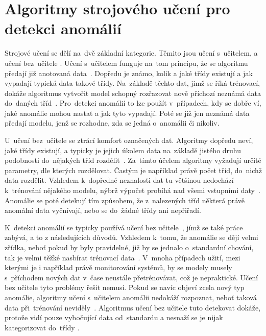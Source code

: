 \chapter{Algoritmy strojového učení pro detekci anomálií}
\label{ml-algoritmy}

Strojové učení se dělí na~dvě základní kategorie. Těmito jsou učení s~učitelem, a učení bez~učitele \cite{data-science-concepts-and-practice}. Učení s~učitelem funguje na~tom principu, že se algoritmu předají již anotovaná data~\cite{data-science-concepts-and-practice}. Dopředu je známo, kolik a jaké třídy existují a jak vypadají typická data takové třídy. Na~základě těchto dat, jimž se říká trénovací, dokáže algoritmus vytvořit model schopný rozřazovat nově příchozí neznámá data do~daných tříd~\cite{data-science-concepts-and-practice}. Pro~detekci anomálií to lze použít v~případech, kdy se dobře ví, jaké anomálie mohou nastat a jak tyto vypadají. Poté se již jen neznámá data předají modelu, jenž se rozhodne, zda se jedná o~anomálii či nikoliv.

U~učení bez~učitele se ztrácí komfort označených dat. Algoritmy dopředu neví, jaké třídy existují, a typicky je jejich úkolem data na~základě jistého druhu podobnosti do~nějakých tříd rozdělit~\cite{data-science-concepts-and-practice}. Za~tímto účelem algoritmy vyžadují určité parametry, dle kterých rozdělovat. Častým je například právě počet tříd, do~nichž data rozdělit. Vzhledem k~dopředné neznalosti dat tu většinou nedochází k~trénování nějakého modelu, nýbrž výpočet probíhá nad všemi vstupními daty~\cite{supervised-vs-unsupervised-learning}. Anomálie se poté detekují tím způsobem, že z~nalezených tříd některá právě anomální data vyčnívají, nebo se do~žádné třídy ani nepřiřadí.

K~detekci anomálií se typicky používá učení bez učitele~\cite{intro-to-anomaly-detection}, jímž se také práce zabývá, a to z následujících důvodů. Vzhledem k~tomu, že anomálie se dějí velmi zřídka, neboť pokud by byly pravidelné, již by se jednalo o~standardní chování, tak je velmi těžké nasbírat trénovací data~\cite{intro-to-anomaly-detection}. V~mnoha případech užití, mezi kterými je i například právě monitorování systémů, by se modely musely s~příchodem nových dat v~čase neustále přetrénovávat, což je nepraktické. Učení bez učitele tyto problémy řešit nemusí. Pokud se navíc objeví zcela nový typ anomálie, algoritmy učení s~učitelem anomálii nedokáží rozpoznat, neboť taková data při~trénování neviděly~\cite{intro-to-anomaly-detection}. Algoritmus učení bez učitele tuto detekovat dokáže, protože vidí pouze vybočující data od~standardu a nesnaží se je nijak kategorizovat do~třídy .

